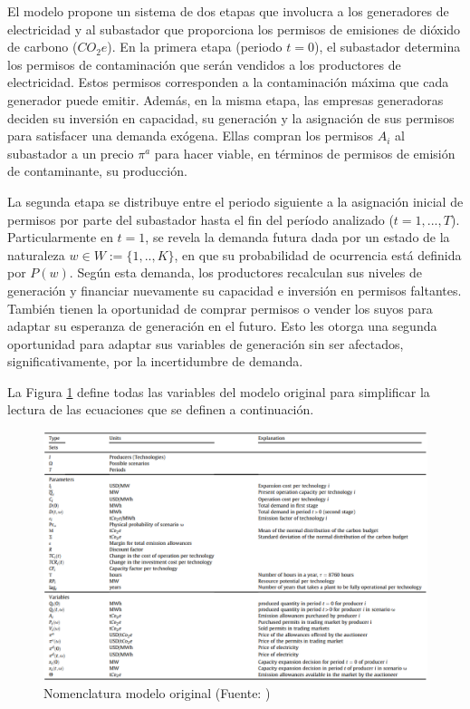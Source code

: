 El modelo propone un sistema de dos etapas que involucra a los generadores de electricidad y al subastador que proporciona los permisos de emisiones de dióxido de carbono ($CO_2 e$). En la primera etapa (periodo $t=0$), el subastador determina los permisos de contaminación que serán vendidos a los productores de electricidad. Estos permisos corresponden a la contaminación máxima que cada generador puede emitir. Además, en la misma etapa, las empresas generadoras deciden su inversión en capacidad, su generación y la asignación de sus permisos para satisfacer una demanda exógena. Ellas compran los permisos $A_i$ al subastador a un precio $\pi^a$ para hacer viable, en términos de permisos de emisión de contaminante, su producción. 
\vspace{2.5mm}

La segunda etapa se distribuye entre el periodo siguiente a la asignación inicial de permisos por parte del subastador hasta el fin del período analizado ($t=1,...,T$). Particularmente en $t=1$,  se revela la demanda futura dada por un estado de la naturaleza $w \in W :=\{ 1,..,K\}$, en que su probabilidad de ocurrencia está definida por $P(w)$. Según esta demanda, los productores recalculan sus niveles de generación y financiar nuevamente su capacidad e inversión en permisos faltantes. También tienen la oportunidad de comprar permisos o vender los suyos para adaptar su esperanza de generación en el futuro. Esto les otorga una segunda oportunidad para adaptar sus variables de generación sin ser afectados, significativamente, por la incertidumbre de demanda.
\vspace{2.5mm}

La Figura \ref{fig:nomenclatura1} define todas las variables del modelo original para simplificar la lectura de las ecuaciones que se definen a continuación.
\vspace{2.5mm}

\begin{figure}[H]
    \centering
    \includegraphics[width=15cm]{docs/DocumentoMemoria/core/images/Tabla amigo.png}
    \caption{Nomenclatura modelo original (Fuente: \protect{})}
    \label{fig:nomenclatura1}
\end{figure}

